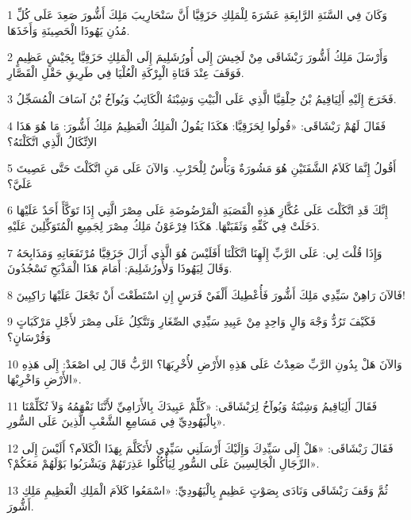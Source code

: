 \par 1 وَكَانَ فِي السَّنَةِ الرَّابِعَةِ عَشَرَةَ لِلْمَلِكِ حَزَقِيَّا أَنَّ سَنْحَارِيبَ مَلِكَ أَشُّورَ صَعِدَ عَلَى كُلِّ مُدُنِ يَهُوذَا الْحَصِينَةِ وَأَخَذَهَا.
\par 2 وَأَرْسَلَ مَلِكُ أَشُّورَ رَبْشَاقَى مِنْ لَخِيشَ إِلَى أُورُشَلِيمَ إِلَى الْمَلِكِ حَزَقِيَّا بِجَيْشٍ عَظِيمٍ فَوَقَفَ عِنْدَ قَنَاةِ الْبِرْكَةِ الْعُلْيَا فِي طَرِيقِ حَقْلِ الْقَصَّارِ.
\par 3 فَخَرَجَ إِلَيْهِ أَلِيَاقِيمُ بْنُ حِلْقِيَّا الَّذِي عَلَى الْبَيْتِ وَشِبْنَةُ الْكَاتِبُ وَيُوآخُ بْنُ آسَافَ الْمُسَجِّلُ.
\par 4 فَقَالَ لَهُمْ رَبْشَاقَى: «قُولُوا لِحَزَقِيَّا: هَكَذَا يَقُولُ الْمَلِكُ الْعَظِيمُ مَلِكُ أَشُّورَ: مَا هُوَ هَذَا الاِتِّكَالُ الَّذِي اتَّكَلْتَهُ؟
\par 5 أَقُولُ إِنَّمَا كَلاَمُ الشَّفَتَيْنِ هُوَ مَشُورَةٌ وَبَأْسٌ لِلْحَرْبِ. وَالآنَ عَلَى مَنِ اتَّكَلْتَ حَتَّى عَصِيتَ عَلَيَّ؟
\par 6 إِنَّكَ قَدِ اتَّكَلْتَ عَلَى عُكَّازِ هَذِهِ الْقَصَبَةِ الْمَرْضُوضَةِ عَلَى مِصْرَ الَّتِي إِذَا تَوَكَّأَ أَحَدٌ عَلَيْهَا دَخَلَتْ فِي كَفِّهِ وَثَقَبَتْهَا. هَكَذَا فِرْعَوْنُ مَلِكُ مِصْرَ لِجَمِيعِ الْمُتَوَكِّلِينَ عَلَيْهِ.
\par 7 وَإِذَا قُلْتَ لِي: عَلَى الرَّبِّ إِلَهِنَا اتَّكَلْنَا أَفَلَيْسَ هُوَ الَّذِي أَزَالَ حَزَقِيَّا مُرْتَفَعَاتِهِ وَمَذَابِحَهُ وَقَالَ لِيَهُوذَا وَلأُورُشَلِيمَ: أَمَامَ هَذَا الْمَذْبَحِ تَسْجُدُونَ.
\par 8 فَالآنَ رَاهِنْ سَيِّدِي مَلِكَ أَشُّورَ فَأُعْطِيكَ أَلْفَيْ فَرَسٍ إِنِ اسْتَطَعْتَ أَنْ تَجْعَلَ عَلَيْهَا رَاكِبِينَ!
\par 9 فَكَيْفَ تَرُدُّ وَجْهَ وَالٍ وَاحِدٍ مِنْ عَبِيدِ سَيِّدِي الصِّغَارِ وَتَتَّكِلُ عَلَى مِصْرَ لأَجْلِ مَرْكَبَاتٍ وَفُرْسَانٍ؟
\par 10 وَالآنَ هَلْ بِدُونِ الرَّبِّ صَعِدْتُ عَلَى هَذِهِ الأَرْضِ لأُخْرِبَهَا؟ الرَّبُّ قَالَ لِي اصْعَدْ: إِلَى هَذِهِ الأَرْضِ وَاخْرِبْهَا».
\par 11 فَقَالَ أَلِيَاقِيمُ وَشِبْنَةُ وَيُوآخُ لِرَبْشَاقَى: «كَلِّمْ عَبِيدَكَ بِالأَرَامِيِّ لأَنَّنَا نَفْهَمُهُ وَلاَ تُكَلِّمْنَا بِالْيَهُودِيِّ فِي مَسَامِعِ الشَّعْبِ الَّذِينَ عَلَى السُّورِ».
\par 12 فَقَالَ رَبْشَاقَى: «هَلْ إِلَى سَيِّدِكَ وَإِلَيْكَ أَرْسَلَنِي سَيِّدِي لأَتَكَلَّمَ بِهَذَا الْكَلاَم؟ أَلَيْسَ إِلَى الرِّجَالِ الْجَالِسِينَ عَلَى السُّورِ لِيَأْكُلُوا عَذِرَتَهُمْ وَيَشْرَبُوا بَوْلَهُمْ مَعَكُمْ؟».
\par 13 ثُمَّ وَقَفَ رَبْشَاقَى وَنَادَى بِصَوْتٍ عَظِيمٍ بِالْيَهُودِيِّ: «اسْمَعُوا كَلاَمَ الْمَلِكِ الْعَظِيمِ مَلِكِ أَشُّورَ.
